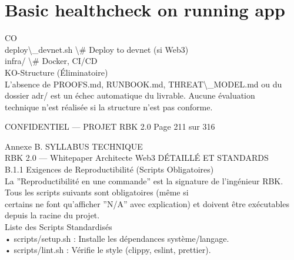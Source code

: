 \section*{Basic healthcheck on running app}
CO\\
deploy\textbackslash{}_devnet.sh          \textbackslash{}# Deploy to devnet (si Web3)\\
\vspace{0.5em}
\vspace{0.5em}
infra/                      \textbackslash{}# Docker, CI/CD\\
\vspace{0.5em}
\vspace{0.5em}
KO-Structure (Éliminatoire)\\
L’absence de PROOFS.md, RUNBOOK.md, THREAT\textbackslash{}_MODEL.md ou du dossier adr/ est un échec automatique du livrable. Aucune évaluation\\
technique n’est réalisée si la structure n’est pas conforme.\\
\vspace{0.5em}
\vspace{0.5em}
\vspace{0.5em}
\vspace{0.5em}
\begin{confidential}CONFIDENTIEL — PROJET RBK 2.0                                 Page 211 sur 316\end{confidential}
Annexe B. SYLLABUS TECHNIQUE\\
RBK 2.0 — Whitepaper Architecte Web3                                                                      DÉTAILLÉ ET STANDARDS\\
\vspace{0.5em}
\vspace{0.5em}
B.1.1 Exigences de Reproductibilité (Scripts Obligatoires)\\
La ”Reproductibilité en une commande” est la signature de l’ingénieur RBK. Tous les scripts suivants sont obligatoires (même si\\
certains ne font qu’afficher ”N/A” avec explication) et doivent être exécutables depuis la racine du projet.\\
\vspace{0.5em}
Liste des Scripts Standardisés\\
\vspace{0.5em}
• scripts/setup.sh : Installe les dépendances système/langage.\\
\vspace{0.5em}
• scripts/lint.sh : Vérifie le style (clippy, eslint, prettier).\\
